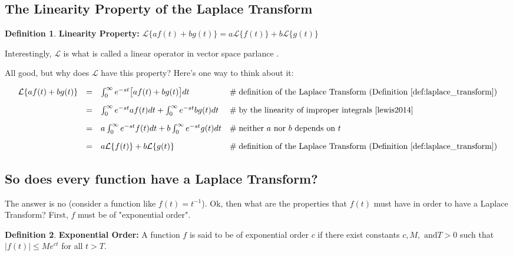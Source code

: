 \documentclass{article}
\theoremstyle{definition}
\newtheorem{definition}{Definition}[section]
\begin{document}
\subsection{The Linearity Property of the Laplace Transform}
\label{subsec:linearity}


\bigskip
\begin{definition} 
{\bf Linearity Property:} $\mathcal{L}\{af (t) + bg(t)\} =
a\mathcal{L}\{f(t)\} + b\mathcal{L}\{g(t)\}$ 
\label{def:linearity_properity}
\end{definition}

\bigskip
\noindent
Interestingly, $\mathcal{L}$ is what is called a linear operator
in vector space parlance \cite{wiki:linear_map}.

\bigskip
\noindent
All good, but why does $\mathcal{L}$ have this property? Here's
one way to think about it:

\smallskip
\begin{equation*}
\begin{array}{lllll}
\mathcal{L}\{af(t) + bg(t)\} 
&=& \int_0^\infty e^{-st} \big [af (t) + bg(t) \big] dt
                & \mathrel{\#} \text{definition of the Laplace Transform (Definition \ref{def:laplace_transform})} \\ 
[10pt]
&=& \int_0^\infty e^{-st} af (t)  dt + \int_0^\infty e^{-st} bg(t) dt 
                & \mathrel{\#} \text{by the linearity of improper integrals \cite{lewis2014}} \\
[10pt]
&=& a \int_0^\infty e^{-st}  f(t) dt + b \int_0^\infty e^{-st}
g(t) dt
                & \mathrel{\#} \text{neither $a$ nor $b$ depends on $t$} \\
[10pt]
&=& a \mathcal{L}\{f(t)\}  + b \mathcal{L}\{g(t)\}
                & \mathrel{\#} \text{definition of the Laplace Transform (Definition \ref{def:laplace_transform})}
\end{array}
\end{equation*}



\smallskip
\subsection{So does every function have a Laplace Transform?}
The answer is no (consider a function like $f(t) = t^{-1}$). Ok,
then what are the properties that $f(t)$ must have in order to
have a Laplace Transform? First, $f$ must be of "exponential
order".


\bigskip
\begin{definition} 
{\bf Exponential Order:} A function $f$ is said to be of
exponential order $c$ if there exist constants $c, M, \text{ and
} T > 0$ such that $|f(t)| \leq Me^{ct}$ for all $t > T$.
\label{def:exponential_order}
\end{definition}
\end{document}
